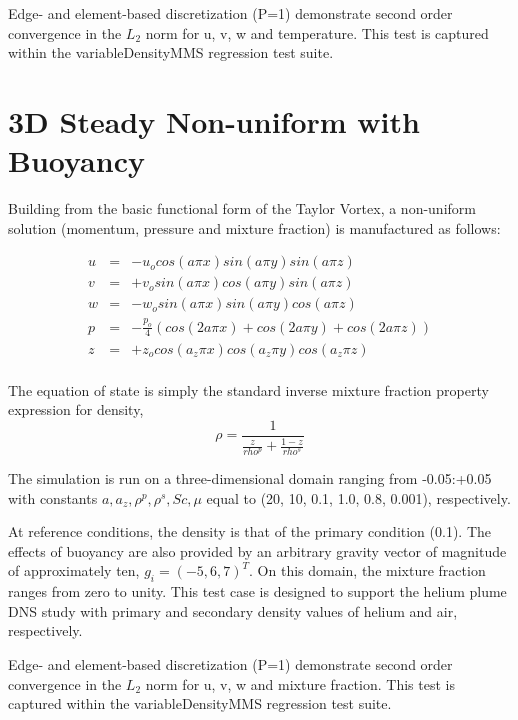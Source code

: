 Edge- and element-based discretization (P=1) demonstrate second order convergence
in the $L_2$ norm for u, v, w and temperature. This test is captured within the 
variableDensityMMS regression test suite.

\section{3D Steady Non-uniform with Buoyancy}

Building from the basic functional form of the Taylor Vortex,
a non-uniform solution (momentum, pressure and mixture fraction)
is manufactured as follows:

\begin{eqnarray}
  u &=& -u_o cos(a \pi x) sin(a \pi y ) sin(a \pi z) \nonumber \\
  v &=& +v_o sin(a \pi x) cos(a \pi y ) sin(a \pi z) \nonumber \\
  w &=& -w_o sin(a \pi x) sin(a \pi y ) cos(a \pi z) \nonumber \\
  p &=& -\frac{p_o}{4}( cos(2 a \pi x) + cos(2 a \pi y ) + cos(2 a \pi z) )  \nonumber \\
  z &=& +z_o cos(a_z \pi x) cos(a_z \pi y ) cos(a_z \pi z)  \nonumber \\
\label{3dNonIso}
\end{eqnarray}

The equation of state is simply the standard inverse mixture fraction 
property expression for density, 
\begin{equation}
  \rho = \frac{1} {\frac{z}{rho^p} + \frac{1-z}{rho^s} }
\label{idealGasEOS}
\end{equation}

The simulation is run on a three-dimensional domain ranging from -0.05:+0.05 with
constants $a, a_z, \rho^p, \rho^s, Sc, \mu$ equal to (20, 10, 0.1, 1.0, 0.8, 0.001),
respectively.

At reference conditions, the density is that of the primary condition (0.1). 
The effects of buoyancy are also provided by an arbitrary gravity vector 
of magnitude of approximately ten, $g_i = (-5, 6, 7)^T$. On this domain, the mixture 
fraction ranges from zero to unity. This test case is designed to support 
the helium plume DNS study with primary and secondary density values of helium
and air, respectively.

Edge- and element-based discretization (P=1) demonstrate second order convergence
in the $L_2$ norm for u, v, w and mixture fraction. This test is captured within the 
variableDensityMMS regression test suite.
